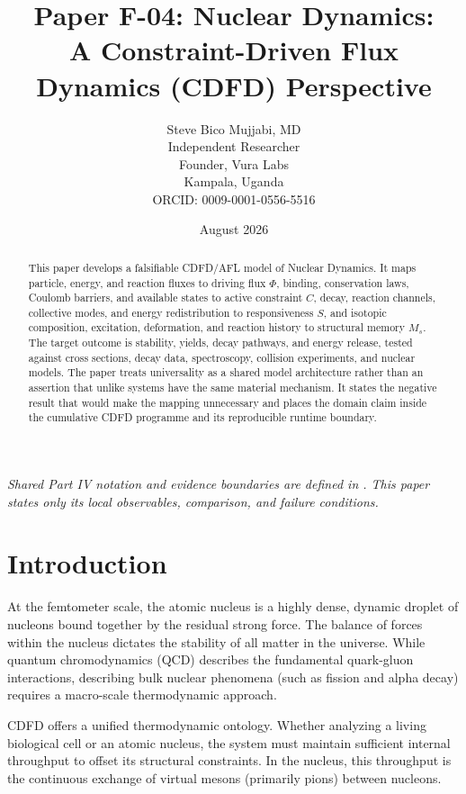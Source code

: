 \documentclass[11pt,a4paper]{article}
\title{\textbf{Paper F-04: Nuclear Dynamics:\\ A Constraint-Driven Flux Dynamics (CDFD) Perspective}}
\author{Steve Bico Mujjabi, MD\\
\small Independent Researcher\\
\small Founder, Vura Labs\\
\small Kampala, Uganda\\
\small ORCID: 0009-0001-0556-5516}
\date{August 2026}
\begin{document}
\maketitle

\noindent\textit{Shared Part IV notation and evidence boundaries are defined in . This paper states only its local observables, comparison, and failure conditions.}


\begin{abstract}
This paper develops a falsifiable CDFD/AFL model of Nuclear Dynamics. It maps particle, energy, and reaction fluxes to driving flux $\Phi$, binding, conservation laws, Coulomb barriers, and available states to active constraint $C$, decay, reaction channels, collective modes, and energy redistribution to responsiveness $S$, and isotopic composition, excitation, deformation, and reaction history to structural memory $M_s$. The target outcome is stability, yields, decay pathways, and energy release, tested against cross sections, decay data, spectroscopy, collision experiments, and nuclear models. The paper treats universality as a shared model architecture rather than an assertion that unlike systems have the same material mechanism. It states the negative result that would make the mapping unnecessary and places the domain claim inside the cumulative CDFD programme and its reproducible runtime boundary.
\end{abstract}

\section{Introduction}

At the femtometer scale, the atomic nucleus is a highly dense, dynamic droplet of nucleons bound together by the residual strong force. The balance of forces within the nucleus dictates the stability of all matter in the universe. While quantum chromodynamics (QCD) describes the fundamental quark-gluon interactions, describing bulk nuclear phenomena (such as fission and alpha decay) requires a macro-scale thermodynamic approach.

CDFD offers a unified thermodynamic ontology. Whether analyzing a living biological cell or an atomic nucleus, the system must maintain sufficient internal throughput to offset its structural constraints. In the nucleus, this throughput is the continuous exchange of virtual mesons (primarily pions) between nucleons.
\end{document}
